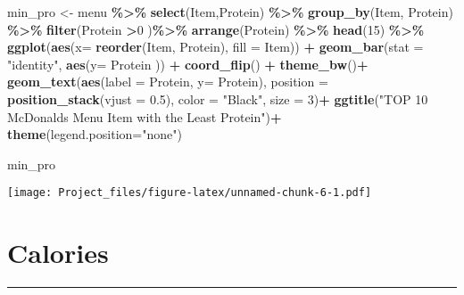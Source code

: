 \documentclass[
]{article}
\newenvironment{Shaded}{\begin{snugshade}}{\end{snugshade}}
\newcommand{\AttributeTok}[1]{\textcolor[rgb]{0.13,0.29,0.53}{#1}}
\newcommand{\DecValTok}[1]{\textcolor[rgb]{0.00,0.00,0.81}{#1}}
\newcommand{\FloatTok}[1]{\textcolor[rgb]{0.00,0.00,0.81}{#1}}
\newcommand{\FunctionTok}[1]{\textcolor[rgb]{0.13,0.29,0.53}{\textbf{#1}}}
\newcommand{\NormalTok}[1]{#1}
\newcommand{\OtherTok}[1]{\textcolor[rgb]{0.56,0.35,0.01}{#1}}
\newcommand{\SpecialCharTok}[1]{\textcolor[rgb]{0.81,0.36,0.00}{\textbf{#1}}}
\newcommand{\StringTok}[1]{\textcolor[rgb]{0.31,0.60,0.02}{#1}}
\begin{document}
\begin{Shaded}
\begin{Highlighting}[]
\NormalTok{min\_pro }\OtherTok{\textless{}{-}}\NormalTok{ menu }\SpecialCharTok{\%\textgreater{}\%} 
  \FunctionTok{select}\NormalTok{(Item,Protein) }\SpecialCharTok{\%\textgreater{}\%}  
  \FunctionTok{group\_by}\NormalTok{(Item, Protein) }\SpecialCharTok{\%\textgreater{}\%} 
  \FunctionTok{filter}\NormalTok{(Protein }\SpecialCharTok{\textgreater{}}\DecValTok{0}\NormalTok{ )}\SpecialCharTok{\%\textgreater{}\%} 
  \FunctionTok{arrange}\NormalTok{(Protein) }\SpecialCharTok{\%\textgreater{}\%} 
  \FunctionTok{head}\NormalTok{(}\DecValTok{15}\NormalTok{)  }\SpecialCharTok{\%\textgreater{}\%} 
  \FunctionTok{ggplot}\NormalTok{(}\FunctionTok{aes}\NormalTok{(}\AttributeTok{x=} \FunctionTok{reorder}\NormalTok{(Item, }
\NormalTok{                        Protein),}
             \AttributeTok{fill =}\NormalTok{ Item)) }\SpecialCharTok{+} 
  \FunctionTok{geom\_bar}\NormalTok{(}\AttributeTok{stat =} \StringTok{"identity"}\NormalTok{,}
           \FunctionTok{aes}\NormalTok{(}\AttributeTok{y=}\NormalTok{ Protein )) }\SpecialCharTok{+}
  \FunctionTok{coord\_flip}\NormalTok{() }\SpecialCharTok{+}
  \FunctionTok{theme\_bw}\NormalTok{()}\SpecialCharTok{+} 
  \FunctionTok{geom\_text}\NormalTok{(}\FunctionTok{aes}\NormalTok{(}\AttributeTok{label =}\NormalTok{ Protein, }
                \AttributeTok{y=}\NormalTok{ Protein),}
            \AttributeTok{position =} \FunctionTok{position\_stack}\NormalTok{(}\AttributeTok{vjust =} \FloatTok{0.5}\NormalTok{),}
            \AttributeTok{color =} \StringTok{"Black"}\NormalTok{,}
            \AttributeTok{size =} \DecValTok{3}\NormalTok{)}\SpecialCharTok{+}
  \FunctionTok{ggtitle}\NormalTok{(}\StringTok{"TOP 10 McDonald\textquotesingle{}s Menu Item with the Least Protein"}\NormalTok{)}\SpecialCharTok{+}
  \FunctionTok{theme}\NormalTok{(}\AttributeTok{legend.position=}\StringTok{"none"}\NormalTok{)}

\NormalTok{min\_pro}
\end{Highlighting}
\end{Shaded}

\texttt{[image: Project\_files/figure-latex/unnamed-chunk-6-1.pdf]}

\hypertarget{calories}{%
\section{Calories}\label{calories}}

\begin{center}\rule{0.5\linewidth}{0.5pt}\end{center}
\end{document}
